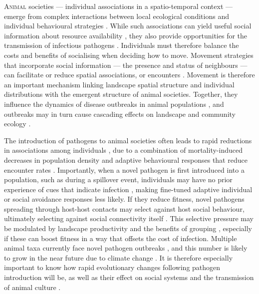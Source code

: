 
\newrefcontext[sorting=ynt]

\lettrine{A}{nimal} societies --- individual associations in a spatio-temporal context --- emerge from complex interactions between local ecological conditions and individual behavioural strategies \citep[][]{whitehead2008,tanner2012,webber2018}.
While such associations can yield useful social information about resource availability \citep{danchin2004,dall2005,gil2018}, they also provide opportunities for the transmission of infectious pathogens \citep[][]{krause2002,weinstein2018,romano2020,albery2021,cantor2021,romano2021}.
Individuals must therefore balance the costs and benefits of socialising when deciding how to move.
Movement strategies that incorporate social information --- the presence and status of neighbours --- can facilitate or reduce spatial associations, or encounters \citep{danchin2004,dall2005,nathan2008a,gil2018,webber2018,webber2022}.
Movement is therefore an important mechanism linking landscape spatial structure and individual distributions with the emergent structure of animal societies.
Together, they influence the dynamics of disease outbreaks in animal populations \citep{white2018a,romano2020,romano2021}, and outbreaks may in turn cause cascading effects on landscape and community ecology \citep{monk2022}.

The introduction of pathogens to animal societies often leads to rapid reductions in associations among individuals \citep[][]{romano2020}, due to a combination of mortality-induced decreases in population density \citep[e.g.][]{fereidouni2019} and adaptive behavioural responses that reduce encounter rates \citep{stroeymeyt2018,romano2020,stockmaier2021}.
Importantly, when a novel pathogen is first introduced into a population, such as during a spillover event, individuals may have no prior experience of cues that indicate infection \citep{power2004}, making fine-tuned adaptive individual or social avoidance responses less likely.
If they reduce fitness, novel pathogens spreading through host-host contacts may select against host social behaviour, ultimately selecting against social connectivity itself \citep{altizer2003,cantor2021,romano2021,poulin2021,ashby2022}.
This selective pressure may be modulated by landscape productivity \citep{hutchings2006} and the benefits of grouping \citep[][]{almberg2015,ezenwa2016}, especially if these can boost fitness in a way that offsets the cost of infection.
Multiple animal taxa currently face novel pathogen outbreaks \citep{blehert2009,globconsorth5n82016,fereidouni2019,scheele2019}, and this number is likely to grow in the near future due to climate change \citep{sanderson2020,carlson2021}.
It is therefore especially important to know how rapid evolutionary changes following pathogen introduction will be, as well as their effect on social systems and the transmission of animal culture \citep{cantor2021, cantor2021a}.


